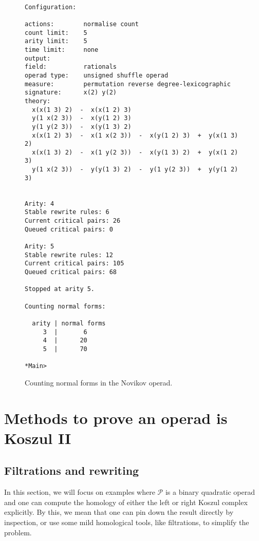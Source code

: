 \documentclass[fleqn, a4paper, twoside]{article}
\newcommand{\0}{\langle 0\rangle}
\DeclareRobustCommand{\[}{\begin{equation}}%
\DeclareRobustCommand{\]}{\end{equation}}%
\theoremstyle{mytheorem}
\theoremstyle{introthm}
\theoremstyle{mydefinition}
\theoremstyle{mydefinition2}
\theoremstyle{plain} %
\newcommand{\?}{\,?\,}
\newcommand{\PP}{{\mathcal{P}}}
\theoremstyle{mytheorem}
\theoremstyle{plain} %
\newcommand\blankpage{%
    \null
    \thispagestyle{empty}%
    \newpage}
\begin{document}
\begin{figure}

\begin{verbatim}

Configuration:

actions:        normalise count 
count limit:    5
arity limit:    5
time limit:     none
output:         
field:          rationals
operad type:    unsigned shuffle operad
measure:        permutation reverse degree-lexicographic 
signature:      x(2) y(2)
theory:
  x(x(1 3) 2)  -  x(x(1 2) 3)
  y(1 x(2 3))  -  x(y(1 2) 3)
  y(1 y(2 3))  -  x(y(1 3) 2)
  x(x(1 2) 3)  -  x(1 x(2 3))  -  x(y(1 2) 3)  +  y(x(1 3) 2)
  x(x(1 3) 2)  -  x(1 y(2 3))  -  x(y(1 3) 2)  +  y(x(1 2) 3)
  y(1 x(2 3))  -  y(y(1 3) 2)  -  y(1 y(2 3))  +  y(y(1 2) 3)


Arity: 4   
Stable rewrite rules: 6   
Current critical pairs: 26   
Queued critical pairs: 0

Arity: 5   
Stable rewrite rules: 12   
Current critical pairs: 105   
Queued critical pairs: 68

Stopped at arity 5.

Counting normal forms:

  arity | normal forms
     3  |       6
     4  |      20
     5  |      70

*Main> 
\end{verbatim}
\caption{Counting normal forms in the Novikov operad.}
\end{figure}
\afterpage{\blankpage}
\newpage


\section{Methods to prove an operad is Koszul II}

\subsection{Filtrations and rewriting}

In this section, we will focus on examples where
$\PP$ is a binary quadratic operad and one can
compute the homology of either the left or
right Koszul complex explicitly. By this, we
mean that one can pin down the result directly
by inspection, or use some mild homological tools,
like filtrations, to simplify the problem.
\end{document}
